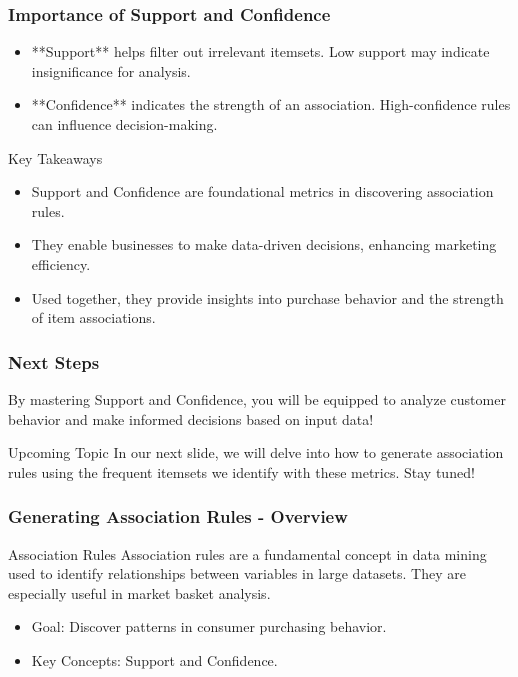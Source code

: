 \documentclass[aspectratio=169]{beamer}
\begin{document}
\begin{frame}[fragile]
    \frametitle{Importance of Support and Confidence}
    \begin{itemize}
        \item **Support** helps filter out irrelevant itemsets. Low support may indicate insignificance for analysis.
        \item **Confidence** indicates the strength of an association. High-confidence rules can influence decision-making.
    \end{itemize}

    \begin{block}{Key Takeaways}
        \begin{itemize}
            \item Support and Confidence are foundational metrics in discovering association rules.
            \item They enable businesses to make data-driven decisions, enhancing marketing efficiency.
            \item Used together, they provide insights into purchase behavior and the strength of item associations.
        \end{itemize}
    \end{block}
\end{frame}

\begin{frame}[fragile]
    \frametitle{Next Steps}
    By mastering Support and Confidence, you will be equipped to analyze customer behavior and make informed decisions based on input data! 

    \begin{block}{Upcoming Topic}
        In our next slide, we will delve into how to generate association rules using the frequent itemsets we identify with these metrics. Stay tuned!
    \end{block}
\end{frame}

\begin{frame}[fragile]
    \frametitle{Generating Association Rules - Overview}
    \begin{block}{Association Rules}
        Association rules are a fundamental concept in data mining used to identify relationships between variables in large datasets. They are especially useful in market basket analysis.
    \end{block}
    \begin{itemize}
        \item Goal: Discover patterns in consumer purchasing behavior.
        \item Key Concepts: Support and Confidence.
    \end{itemize}
\end{frame}
\end{document}
